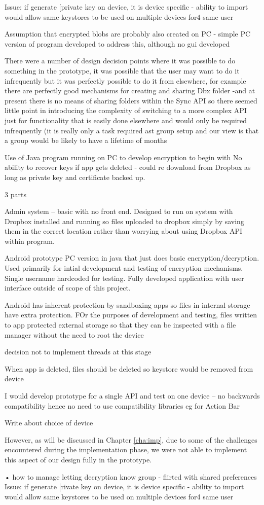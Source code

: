 Issue: if generate [private key on device, it is device specific - ability to import would allow same keystores to be used on multiple devices for4 same user

Assumption that encrypted blobs are probably also created on PC - simple PC version of program developed to address this, although no gui developed

There were a number of design decision points where it was possible to do something in the prototype, it was possible that the user may want to do it infrequently but it was perfectly possible to do it from elsewhere, for example there are perfectly good mechanisms for creating and sharing Dbx folder  -and at present there is no means of sharing folders within the Sync API so there seemed little point in introducing the complexity of switching to a more complex API just for functionality that is easily done elsewhere and would only be required infrequently (it is really only a task required ast group setup and our view is that a group would be likely to have a lifetime of months

Use of Java program running on PC to develop encryption to begin with
No ability to recover keys if app gets deleted - could re download from Dropbox as long as private key and certificate backed up. 

3 parts

Admin system – basic with no front end.  Designed to run on system with Dropbox installed and running so files uploaded to dropbox simply by saving them in the correct location rather than worrying about using Dropbox API within program.

	Android prototype
	PC version in java that just does basic encryption/decryption.  Used primarily for intial development and testing of encryption mechanisms. Single username hardcoded for testing. Fully developed application with user interface outside of scope of this project.
	
	Android has inherent protection by sandboxing apps so files in internal storage have extra protection. FOr the purposes of development and testing, files written to app protected external storage so that they can be inspected with a file manager without the need to root the device

decision not to implement threads at this stage

When app is deleted, files should be deleted so keystore would be removed from device

I would develop prototype for a single API and test on one device – no backwards compatibility hence no need to use compatibility libraries eg for Action Bar

Write about choice of device

However, as will be discussed in Chapter \ref{cha:imp}, due to some of the challenges encountered during the implementation phase, we were not able to implement this aspect of our design fully in the prototype.

• how to manage letting decryption know group - flirted with shared preferences
Issue: if generate [rivate key on device, it is device specific - ability to import would allow same keystores to be used on multiple devices for4 same user